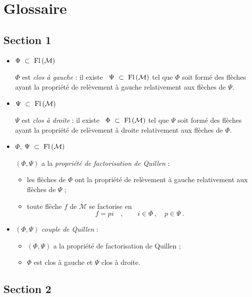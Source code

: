 \clearpage


\setcounter{footnote}{0}
\renewcommand{\thefootnote}{\fnsymbol{footnote}}
\section*{Glossaire}

\subsection*{Section 1}

\begin{itemize}
\item $\Phi \ \subset\ \Fl(\mathcal{M})$

$\Phi$ est \textit{clos à gauche} : il existe \ $\Psi \ \subset\ \Fl(\mathcal{M})$ tel que $\Phi$ soit formé des flèches ayant la propriété de relèvement à gauche relativement aux flèches de $\Psi$.

\item $\Psi \ \subset\ \Fl(\mathcal{M})$

$\Psi$ est \textit{clos à droite} : il existe \ $\Phi \ \subset\ \Fl(\mathcal{M})$ tel que $\Psi$ soit formé des flèches ayant la propriété de relèvement à droite relativement aux flèches de $\Phi$.

\item $\Phi$, $\Psi \ \subset\ \Fl(\mathcal{M})$

$(\Phi, \Psi)$ a la \textit{propriété de factorisation de Quillen} :
\begin{itemize}
\item[a)] les flèches de $\Phi$ ont la propriété de relèvement à gauche relativement aux flèches de $\Psi$ ;
\item[b)] toute flèche $f$ de $\mathcal{M}$ se factorise en
\[
f = pi \quad , \qquad i \in \Phi \ , \quad p \in \Psi \ .
\]
\end{itemize}

\item $(\Phi, \Psi)$ \textit{couple de Quillen} :
\begin{itemize}
\item[a)] $(\Phi, \Psi)$ a la propriété de factorisation de Quillen ;
\item[b)] $\Phi$ est clos à gauche et $\Psi$ clos à droite.
\end{itemize}
\end{itemize}

\subsection*{Section 2}

